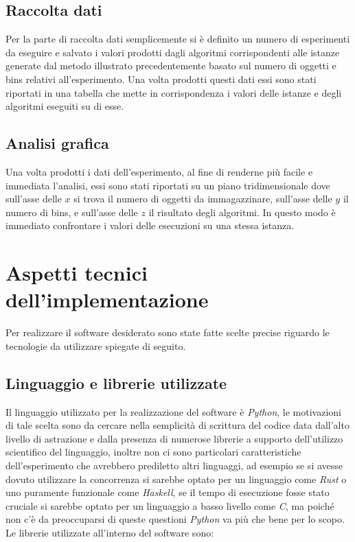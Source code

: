 \subsection{Raccolta dati}
Per la parte di raccolta dati semplicemente si è definito un numero di esperimenti da eseguire e salvato i valori prodotti dagli algoritmi corrispondenti
alle istanze generate dal metodo illustrato precedentemente basato sul numero di oggetti e bins relativi all'esperimento. Una volta prodotti questi dati
essi sono stati riportati in una tabella che mette in corrispondenza i valori delle istanze e degli algoritmi eseguiti su di esse.

\subsection{Analisi grafica}
Una volta prodotti i dati dell'esperimento, al fine di renderne più facile e immediata l'analisi, essi sono stati riportati su un piano tridimensionale 
dove sull'asse delle $ x $ si trova il numero di oggetti da immagazzinare, sull'asse delle $ y $ il numero di bins, e sull'asse delle $ z $
il risultato degli algoritmi. In questo modo è immediato confrontare i valori delle esecuzioni su una stessa istanza.


\section{Aspetti tecnici dell'implementazione}
Per realizzare il software desiderato sono state fatte scelte precise riguardo le tecnologie da utilizzare spiegate di seguito.

\subsection{Linguaggio e librerie utilizzate}
Il linguaggio utilizzato per la realizzazione del software è \textit{Python}, le motivazioni di tale scelta sono da cercare nella semplicità di scrittura 
del codice data dall'alto livello di astrazione e dalla presenza di numerose librerie a supporto dell'utilizzo scientifico del linguaggio, inoltre
non ci sono particolari caratteristiche dell'esperimento che avrebbero prediletto altri linguaggi, ad esempio se si avesse dovuto utilizzare la concorrenza 
si sarebbe optato per un linguaggio come \textit{Rust} o uno puramente funzionale come \textit{Haskell}, se il tempo di esecuzione fosse stato cruciale si sarebbe
optato per un linguaggio a basso livello come \textit{C}, ma poiché non c'è da preoccuparsi di queste questioni \textit{Python} va più che bene per lo
scopo.\\
Le librerie utilizzate all'interno del software sono:

